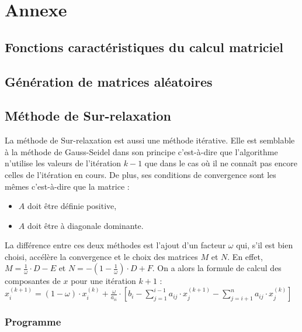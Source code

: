 \documentclass{report}
\begin{document}
  \chapter{Annexe}
    \section{Fonctions caractéristiques du calcul matriciel}
      
      
      \newpage
    \section{Génération de matrices aléatoires}
      
      
      \newpage
    \section{Méthode de Sur-relaxation}
    La méthode de Sur-relaxation est aussi une méthode itérative. Elle est semblable à la méthode de Gauss-Seidel dans son principe c'est-à-dire que l'algorithme n'utilise les valeurs de l'itération $k-1$ que dans le cas où il ne connaît pas encore celles de l'itération en cours.
    \newline
    De plus, ses conditions de convergence sont les mêmes c'est-à-dire que la matrice :
          \begin{itemize}
        \item{$A$ doit être définie positive,}
        \item{$A$ doit être à diagonale dominante.}
      \end{itemize}
    La différence entre ces deux méthodes est l'ajout d'un facteur $ \omega $ qui, s'il est bien choisi, accélère la convergence et le choix des matrices $M$ et $N$. 
    \newline
    En effet, $M = \frac{1}{\omega} \cdot D - E$ et $N = - \left( 1- \frac{1}{\omega} \right) \cdot D + F $.
    \newline
    On a alors la formule de calcul des composantes de $x$ pour une itération $k+1$ :
    \newline
    $x_{i}^{(k+1)} = (1 - \omega) \cdot x_{i}^{(k)} +  \frac{\omega}{a_{ii}} \cdot \left [ b_{i} - \sum_{j=1}^{i-1} a_{ij} \cdot x_{j}^{(k+1)} - \sum_{j=i+1}^{n} a_{ij} \cdot x_{j}^{(k)} \right ] $
      \newline
      \subsection{Programme}
        
  
\end{document}
